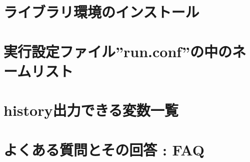 \documentclass[a4paper]{jreport}
\begin{document}



\begin{appendix}
\chapter{ライブラリ環境のインストール} \label{achap:env_setting}

\chapter{実行設定ファイル''run.conf''の中のネームリスト} \label{achap:namelist}

\chapter{history出力できる変数一覧} \label{achap:histroy_item}

\chapter{よくある質問とその回答 : FAQ} \label{achap:practice}


%
\end{appendix}

\ClearWallPaper

\end{document}
